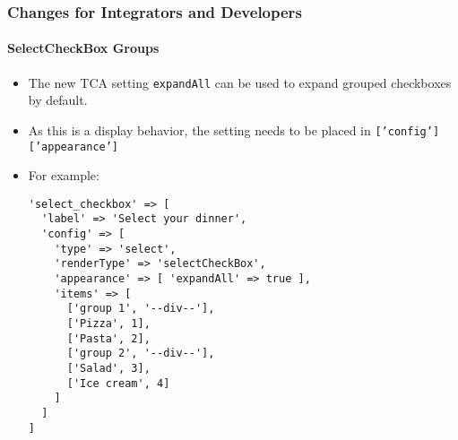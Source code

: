 %

\begin{frame}[fragile]
	\frametitle{Changes for Integrators and Developers}
	\framesubtitle{SelectCheckBox Groups}

	\lstset{basicstyle=\tiny\ttfamily}

	\begin{itemize}
		\item The new TCA setting \texttt{expandAll} can be used to expand
			grouped checkboxes by default.
		\item As this is a display behavior, the setting needs to be placed
		 	in \smaller\texttt{['config']['appearance']}\normalsize
		\item For example:
\begin{lstlisting}
'select_checkbox' => [
  'label' => 'Select your dinner',
  'config' => [
    'type' => 'select',
    'renderType' => 'selectCheckBox',
    'appearance' => [ 'expandAll' => true ],
    'items' => [
      ['group 1', '--div--'],
      ['Pizza', 1],
      ['Pasta', 2],
      ['group 2', '--div--'],
      ['Salad', 3],
      ['Ice cream', 4]
    ]
  ]
]
\end{lstlisting}

	\end{itemize}

\end{frame}

